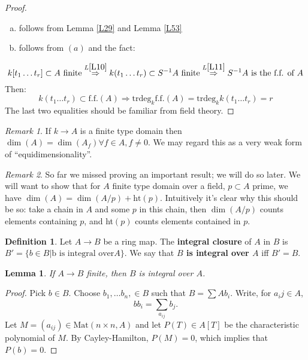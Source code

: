 \documentclass{article}
\theoremstyle{plain}
\newtheorem{lem}[thm]{Lemma}
\theoremstyle{definition}
\newtheorem{defn}{Definition}
\theoremstyle{remark}
\newtheorem*{rem}{Remark}
\begin{document}
\begin{proof}\hspace{1mm}
\begin{enumerate} [(a)]
\item follows from Lemma \ref{L29} and Lemma \ref{L53}
\item follows from $(a)$ and the fact:
\end{enumerate}
\[       k[t_1 \dots t_r] \subset A \text{ finite}  \overset{L \ref{L10}}{\Rightarrow}  k(t_1 \dots t_r) \subset S^{-1}A \text{ finite}   \overset{L \ref{L11}}{\Rightarrow} S^{-1}A \text{ is the f.f. of } A \]
Then:
\[     k(t_1 \dots t_r) \subset \text{f.f.}(A)  \Rightarrow \text{trdeg}_k \text{f.f.}(A) = \text{trdeg}_k k(t_1 \dots t_r) = r     \]
The last two equalities should be familiar from field theory.
\end{proof}

\begin{rem}
If $k\to A$ is a finite type domain then $\dim(A) = \dim(A_f) \forall f\in A, f\neq 0$. We may regard this as a very weak form of ``equidimensionality''.
\end{rem}
\begin{rem}
So far we missed proving an important result; we will do so later. We will want to show that for $A$ finite type domain over a field, $p \subset A$ prime, we have $\dim(A) = \dim(A/p) + \text{ht}(p)$. Intuitively it's clear why this should be so: take a chain in $A$ and some $p$ in this chain, then $\dim(A/p)$ counts elements containing $p$, and ht$(p)$ counts elements contained in $p$.
\end{rem}

\begin{defn}
Let $A\to B$ be a ring map. The \textbf{integral closure} of $A$ in $B$ is $B' = \{b\in B | \text{b is integral over} A\}$. We say that \textbf{$B$ is integral over $A$} iff $B'=B$.
\end{defn}

\begin{lem}
\label{L55}
If $A\to B$ finite, then $B$ is integral over $A$.
\end{lem}

\begin{proof}
Pick $b\in B$. Choose $b_1, \dots b_n, \in B$ such that $B = \sum A b_i$. 
Write, for $a_ij\in A$,
\[bb_i=\sum_{a_{ij}}b_j.\]
Let $M=(a_{ij})\in\text{Mat}(n\times n, A)$ and let $P(T)\in A[T]$ be the characteristic polynomial of $M$. By Cayley-Hamilton, $P(M)=0$, which implies that $P(b)=0$.
\end{proof}
\end{document}
